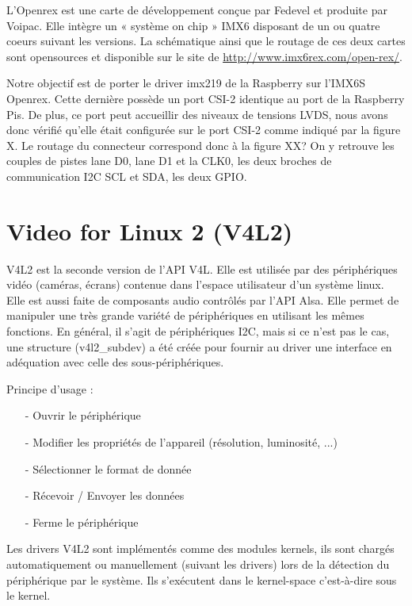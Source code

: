 L’Openrex est une carte de développement conçue par Fedevel et produite par Voipac.
Elle intègre un « système on chip » IMX6 disposant de un ou quatre coeurs suivant les
versions. La schématique ainsi que le routage de ces deux cartes sont opensources et
disponible sur le site de \href{http://www.imx6rex.com/open-rex/}{http://www.imx6rex.com/open-rex/}.


Notre objectif est de porter le driver imx219 de la Raspberry sur l’IMX6S Openrex. Cette
dernière possède un port CSI-2 identique au port de la Raspberry Pis. De plus, ce port peut accueillir des niveaux de tensions LVDS, nous avons donc vérifié qu’elle était
configurée sur le port CSI-2 comme indiqué par la figure X. Le routage du connecteur
correspond donc à la figure XX? On y retrouve les couples de pistes lane D0, lane D1 et la 
CLK0, les deux broches de communication I2C SCL et SDA, les deux GPIO.

\section{Video for Linux 2 (V4L2)}

V4L2 est la seconde version de l’API V4L. Elle est utilisée par des périphériques vidéo
(caméras, écrans) contenue dans l’espace utilisateur d’un système linux. Elle est aussi
faite de composants audio contrôlés par l’API Alsa. Elle permet de manipuler une très
grande variété de périphériques en utilisant les mêmes fonctions. En général, il s’agit de
périphériques I2C, mais si ce n’est pas le cas, une structure (v4l2\_subdev) a été créée
pour fournir au driver une interface en adéquation avec celle des sous-périphériques.

Principe d'usage :

\begin{itemize}
    \item[-] Ouvrir le périphérique
    \item[-] Modifier les propriétés de l'appareil (résolution, luminosité, ...)
    \item[-] Sélectionner le format de donnée
    \item[-] Récevoir / Envoyer les données
    \item[-] Ferme le périphérique
\end{itemize}

Les drivers V4L2 sont implémentés comme des modules kernels, ils sont chargés
automatiquement ou manuellement (suivant les drivers) lors de la détection du
périphérique par le système. Ils s’exécutent dans le kernel-space c’est-à-dire sous le
kernel.

